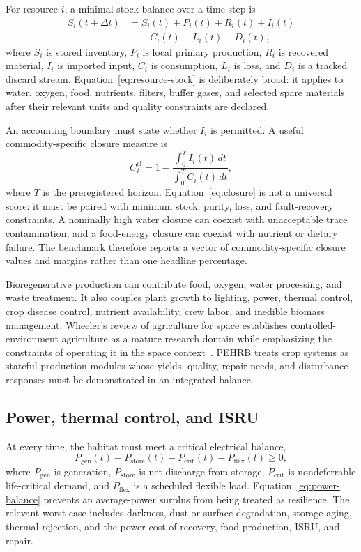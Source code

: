 \documentclass[10pt,conference]{IEEEtran}
\begin{document}
For resource $i$, a minimal stock balance over a time step is
\begin{align}
S_i(t+\Delta t)&=S_i(t)+P_i(t)+R_i(t)+I_i(t) \nonumber\\
&\quad-C_i(t)-L_i(t)-D_i(t),
\label{eq:resource-stock}
\end{align}
where $S_i$ is stored inventory, $P_i$ is local primary production, $R_i$ is recovered material, $I_i$ is imported input, $C_i$ is consumption, $L_i$ is loss, and $D_i$ is a tracked discard stream. Equation~\eqref{eq:resource-stock} is deliberately broad: it applies to water, oxygen, food, nutrients, filters, buffer gases, and selected spare materials after their relevant units and quality constraints are declared.

An accounting boundary must state whether $I_i$ is permitted. A useful commodity-specific closure measure is
\begin{equation}
C_i^{\mathrm{cl}}=1-\frac{\int_0^T I_i(t)\,dt}{\int_0^T C_i(t)\,dt},
\label{eq:closure}
\end{equation}
where $T$ is the preregistered horizon. Equation~\eqref{eq:closure} is not a universal score: it must be paired with minimum stock, purity, loss, and fault-recovery constraints. A nominally high water closure can coexist with unacceptable trace contamination, and a food-energy closure can coexist with nutrient or dietary failure. The benchmark therefore reports a vector of commodity-specific closure values and margins rather than one headline percentage.

Bioregenerative production can contribute food, oxygen, water processing, and waste treatment. It also couples plant growth to lighting, power, thermal control, crop disease control, nutrient availability, crew labor, and inedible biomass management. Wheeler's review of agriculture for space establishes controlled-environment agriculture as a mature research domain while emphasizing the constraints of operating it in the space context~\cite{wheeler2017}. PEHRB treats crop systems as stateful production modules whose yields, quality, repair needs, and disturbance responses must be demonstrated in an integrated balance.

\subsection{Power, thermal control, and ISRU}

At every time, the habitat must meet a critical electrical balance,
\begin{equation}
P_{\mathrm{gen}}(t)+P_{\mathrm{store}}(t)-P_{\mathrm{crit}}(t)-P_{\mathrm{flex}}(t)\geq 0,
\label{eq:power-balance}
\end{equation}
where $P_{\mathrm{gen}}$ is generation, $P_{\mathrm{store}}$ is net discharge from storage, $P_{\mathrm{crit}}$ is nondeferrable life-critical demand, and $P_{\mathrm{flex}}$ is a scheduled flexible load. Equation~\eqref{eq:power-balance} prevents an average-power surplus from being treated as resilience. The relevant worst case includes darkness, dust or surface degradation, storage aging, thermal rejection, and the power cost of recovery, food production, ISRU, and repair.
\end{document}
